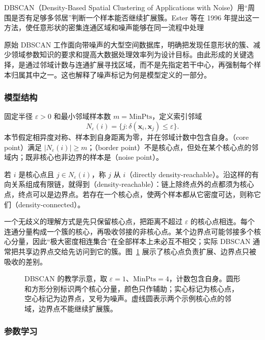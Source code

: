 DBSCAN（Density-Based Spatial Clustering of Applications with Noise）用“周围是否有足够多邻居”判断一个样本能否继续扩展簇。Ester 等在 1996 年提出这一方法，使任意形状的密集连通区域和噪声能够在同一流程中处理

原始 DBSCAN 工作面向带噪声的大型空间数据库，明确把发现任意形状的簇、减少领域参数知识的要求和提高大数据处理效率列为设计目标。由此形成的关键选择，是通过邻域计数与连通扩展寻找区域，而不是先指定若干中心，再强制每个样本归属其中之一。这也解释了噪声标记为何是模型定义的一部分。

\subsubsection{模型结构}

固定半径 $\varepsilon>0$ 和最小邻域样本数 $m=\mathrm{MinPts}$，定义索引邻域
\[
 N_\varepsilon(i)=
 \{j:\delta(\bm{x}_i,\bm{x}_j)\leq\varepsilon\}.
\]
本节假定相异度对称、样本到自身距离为零，并在邻域计数中包含自身。（core point）满足 $|N_\varepsilon(i)|\geq m$；（border point）不是核心点，但处在某个核心点的邻域内；既非核心也非边界的样本是（noise point）。

若 $i$ 是核心点且 $j\in N_\varepsilon(i)$，称 $j$ 从 $i$（directly density-reachable）。沿这样的有向关系组成有限链，就得到（density-reachable）：链上除终点外的点都须为核心点，终点可以是边界点。若存在一个核心点，使两个样本都从它密度可达，则称它们（density-connected）。

一个无歧义的理解方式是先只保留核心点，把距离不超过 $\varepsilon$ 的核心点相连。每个连通分量构成一个簇的核心，再吸收邻接的非核心点。某个边界点可能邻接多个核心分量，因此“极大密度相连集合”在全部样本上未必互不相交；实际 DBSCAN 通常把共享边界点交给先访问到它的簇。图~\ref{fig:clustering-dbscan} 展示了核心点负责扩展、边界点只被吸收的差别。

\begin{figure}[htbp]
 \centering
 
 \caption{DBSCAN 的教学示意，取 $\varepsilon=1$、$\mathrm{MinPts}=4$，计数包含自身。圆形和方形分别标识两个核心分量，颜色只作辅助；实心标记为核心点，空心标记为边界点，叉号为噪声。虚线圆表示两个示例核心点的邻域，边界点不能继续扩展簇。}
 \label{fig:clustering-dbscan}
\end{figure}

\subsubsection{参数学习}

